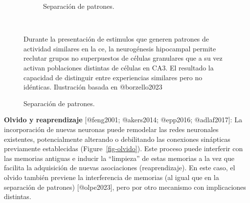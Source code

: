 \documentclass[
  11pt]{../MastersDoctoralThesisUNAM}
\begin{document}
\begin{tcolorbox}[enhanced jigsaw, colframe=quarto-callout-warning-color-frame, left=2mm, bottomrule=.15mm, rightrule=.15mm, arc=.35mm, toprule=.15mm, leftrule=.75mm, breakable, opacityback=0, colback=white]
\begin{figure}[H]
\begin{minipage}{0.50\linewidth}
\begin{figure}[H]
{}

\caption{\label{fig-separacionpatrones}Separación de patrones.}

\end{figure}%

\end{minipage}%
%
\begin{minipage}{0.05\linewidth}
~\end{minipage}%
%
\begin{minipage}{0.45\linewidth}
Durante la presentación de estimulos que generen patrones de actividad
similares en la \ac{ce}, la neurogénesis hipocampal permite reclutar
grupos no superpuestos de células granulares que a su vez activan
poblaciones distintas de células en CA3. El resultado la capacidad de
distinguir entre experiencias similares pero no idénticas. Ilustración
basada en @borzello2023\end{minipage}%

\end{figure}%

\textbf{Olvido y reaprendizaje} {[}@feng2001; @akers2014; @epp2016;
@adlaf2017{]}: La incorporación de nuevas neuronas puede remodelar las
redes neuronales existentes, potencialmente alterando o debilitando las
conexiones sinápticas previamente establecidas
(Figure~\ref{fig-olvido}). Este proceso puede interferir con las
memorias antiguas e inducir la ``limpieza'' de estas memorias a la vez
que facilita la adquisición de nuevas asociaciones (reaprendizaje). En
este caso, el olvido también previene la interferencia de memorias (al
igual que en la separación de patrones) {[}@olpe2023{]}, pero por otro
mecanismo con implicaciones distintas.

\begin{figure}[H]

\begin{minipage}{0.50\linewidth}

\begin{figure}[H]

\centering{

}
\end{figure}
\end{minipage}
\end{figure}
\end{tcolorbox}
\end{document}
